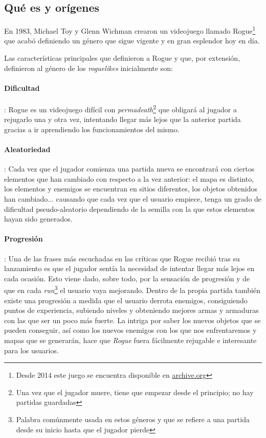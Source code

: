 \subsection{Qué es y orígenes}

En 1983, Michael Toy y Glenn Wichman crearon un videojuego llamado Rogue\footnote{Desde 2014 este juego se encuentra disponible en \href{https://archive.org/details/msdos_Rogue_1983}{archive.org}} que acabó definiendo un género que sigue vigente y en gran esplendor hoy en día.

Las características principales que definieron a Rogue y que, por extensión, definieron al género de los \textit{roguelikes} inicialmente son:

\paragraph{Dificultad}: Rogue es un videojuego difícil con \textit{permadeath}\footnote{Una vez que el jugador muere, tiene que empezar desde el principio; no hay partidas guardadas} que obligará al jugador a rejugarlo una y otra vez, intentando llegar más lejos que la anterior partida gracias a ir aprendiendo los funcionamientos del mismo.

\paragraph{Aleatoriedad}: Cada vez que el jugador comienza una partida nueva se encontrará con ciertos elementos que han cambiado con respecto a la vez anterior: el mapa es distinto, los elementos y enemigos se encuentran en sitios diferentes, los objetos obtenidos han cambiado... causando que cada vez que el usuario empiece, tenga un grado de dificultad pseudo-aleatorio dependiendo de la semilla con la que estos elementos hayan sido generados.

\paragraph{Progresión}: Una de las frases más escuchadas en las críticas que Rogue recibió tras su lanzamiento es que el jugador sentía la necesidad de intentar llegar más lejos en cada ocasión\cite{website:machinesnetworks}. Esto viene dado, sobre todo, por la sensación de progresión y de que en cada \textit{run}\footnote{Palabra comúnmente usada en estos géneros y que se refiere a una partida desde su inicio hasta que el jugador pierde} el usuario vaya mejorando. Dentro de la propia partida también existe una progresión a medida que el usuario derrota enemigos, consiguiendo puntos de experiencia, subiendo niveles y obteniendo mejores armas y armaduras con las que ser un poco más fuerte. La intriga por saber los nuevos objetos que se pueden conseguir, así como los nuevos enemigos con los que nos enfrentaremos y mapas que se generarán, hace que \textit{Rogue} fuera fácilmente rejugable e interesante para los usuarios.

